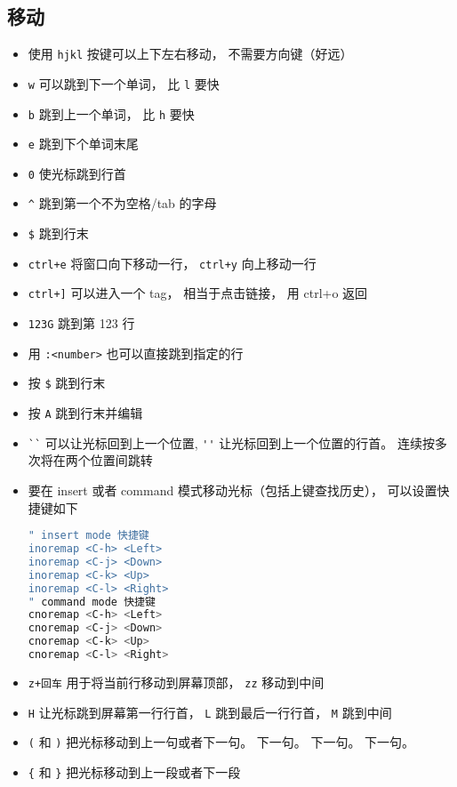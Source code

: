 \subsection{移动}
\begin{itemize}
\item 使用 \verb|hjkl| 按键可以上下左右移动， 不需要方向键（好远）
\item \verb`w` 可以跳到下一个单词， 比 \verb`l` 要快
\item \verb`b` 跳到上一个单词， 比 \verb`h` 要快
\item \verb`e` 跳到下个单词末尾
\item \verb`0` 使光标跳到行首
\item \verb`^` 跳到第一个不为空格/tab 的字母
\item \verb`$` 跳到行末
\item \verb`ctrl+e` 将窗口向下移动一行， \verb`ctrl+y` 向上移动一行
\item \verb`ctrl+]` 可以进入一个 tag， 相当于点击链接， 用 ctrl+o 返回
\item \verb`123G` 跳到第 123 行
\item 用 \verb`:<number>` 也可以直接跳到指定的行
\item 按 \verb`$` 跳到行末
\item 按 \verb`A` 跳到行末并编辑
\item \verb|``| 可以让光标回到上一个位置, \verb`''` 让光标回到上一个位置的行首。 连续按多次将在两个位置间跳转
\item 要在 insert 或者 command 模式移动光标（包括上键查找历史）， 可以设置快捷键如下
\begin{lstlisting}[language=bash]
" insert mode 快捷键
inoremap <C-h> <Left>
inoremap <C-j> <Down>
inoremap <C-k> <Up>
inoremap <C-l> <Right>
" command mode 快捷键
cnoremap <C-h> <Left>
cnoremap <C-j> <Down>
cnoremap <C-k> <Up>
cnoremap <C-l> <Right>
\end{lstlisting}
\item \verb`z+回车` 用于将当前行移动到屏幕顶部， \verb`zz` 移动到中间
\item \verb`H` 让光标跳到屏幕第一行行首， \verb`L` 跳到最后一行行首， \verb`M` 跳到中间
\item \verb`(` 和 \verb`)` 把光标移动到上一句或者下一句。 下一句。 下一句。 下一句。
\item \verb`{` 和 \verb`}` 把光标移动到上一段或者下一段
\end{itemize}

